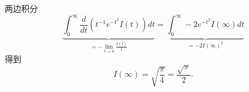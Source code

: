 \begin{itemize}
两边积分
$$
\underbrace{\int_0^{\infty} \frac{d}{d t}\left(t^{-1} e^{-t^2} I(t)\right) d t}_{=-\lim _{t \rightarrow 0} \frac{I(t)}{t}}=\underbrace{\int_0^{\infty}-2 e^{-t^2} I(\infty) d t}_{=-2 I(\infty)^2}
$$
得到
$$
I(\infty) = \sqrt{\frac{\pi}{4}} = \frac{\sqrt{\pi}}{2}.
$$

\end{itemize}


